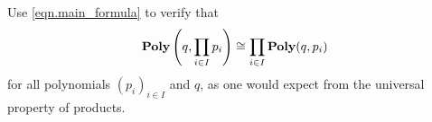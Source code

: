 \documentclass[Book-Poly]{subfiles}
\begin{document}
\begin{exercise}%


	Use \eqref{eqn.main_formula}
	to verify that
	\[
	    \mathbf{Poly}\left(q, \prod_{i \in I} p_i\right) \cong \prod_{i \in I} \mathbf{Poly}(q, p_i)
	\]
	for all polynomials $(p_i)_{i \in I}$ and $q$, as one would expect from the universal property of products.
\qedhere
\begin{solution}



\end{solution}
\end{exercise}
\end{document}
